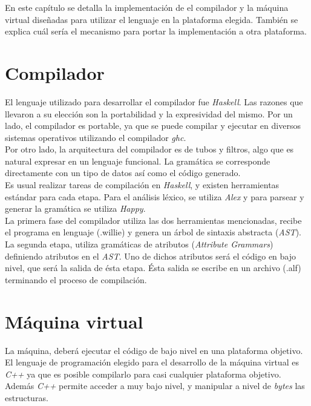 
En este capítulo se detalla la implementación de el compilador
y la máquina virtual diseñadas para utilizar el lenguaje
\frob en la plataforma elegida.
También se explica cuál sería el mecanismo para portar la
implementación a otra plataforma.


\section{Compilador}

  El lenguaje utilizado para desarrollar el compilador fue \textit{Haskell}.
Las razones que llevaron a su elección son la portabilidad y la expresividad
del mismo.
Por un lado, el compilador es portable, ya que se puede compilar y ejecutar
en diversos sistemas operativos utilizando el compilador \textit{ghc}.\\

  Por otro lado, la arquitectura del compilador es de tubos y filtros, algo
  que es natural expresar en un lenguaje funcional.
  La gramática se corresponde directamente con un tipo de datos así
  como el código generado.\\

  Es usual realizar tareas de compilación en \textit{Haskell}, y existen
herramientas estándar para cada etapa.
  Para el análisis léxico, se utiliza \textit{Alex} \cite{alex} y
  para parsear y generar
  la gramática se utiliza \textit{Happy}. \cite{happy} \\

  La primera fase del compilador utiliza las dos herramientas mencionadas,
recibe el programa en lenguaje \frob (.willie) y genera un árbol de
sintaxis abstracta (\emph{AST}).\\

  La segunda etapa, utiliza gramáticas de atributos (\emph{Attribute Grammars})
definiendo atributos en el \emph{AST}.
  Uno de dichos atributos será el código en bajo nivel, que será la salida
de ésta etapa.
  Ésta salida se escribe en un archivo (.alf) terminando el proceso
  de compilación.

\section{Máquina virtual}

  La máquina, deberá ejecutar el código de bajo nivel en una plataforma
  objetivo.
  El lenguaje de programación elegido para el desarrollo de la máquina virtual
es \textit{C++} ya que es posible compilarlo para casi cualquier plataforma
objetivo.
  Además \textit{C++} permite acceder a muy bajo nivel, y manipular a
  nivel de \emph{bytes} las estructuras.\\

